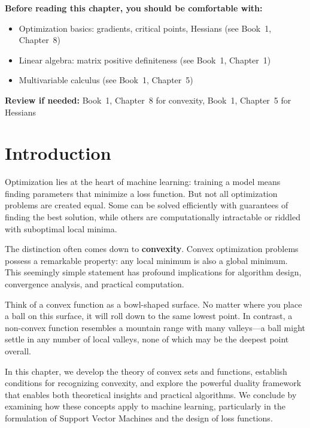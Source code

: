 \documentclass[../../main.tex]{subfiles}
\begin{document}
\begin{prerequisites}
\textbf{Before reading this chapter, you should be comfortable with:}
\begin{itemize}
    \item Optimization basics: gradients, critical points, Hessians (see Book~1, Chapter~8)
    \item Linear algebra: matrix positive definiteness (see Book~1, Chapter~1)
    \item Multivariable calculus (see Book~1, Chapter~5)
\end{itemize}
\textbf{Review if needed:} Book~1, Chapter~8 for convexity, Book~1, Chapter~5 for Hessians
\end{prerequisites}

\section{Introduction}
\label{sec:convex-intro}

Optimization lies at the heart of machine learning: training a model means finding parameters that minimize a loss function. But not all optimization problems are created equal. Some can be solved efficiently with guarantees of finding the best solution, while others are computationally intractable or riddled with suboptimal local minima.

The distinction often comes down to \textbf{convexity}. Convex optimization problems possess a remarkable property: any local minimum is also a global minimum. This seemingly simple statement has profound implications for algorithm design, convergence analysis, and practical computation.

\begin{intuition}
Think of a convex function as a bowl-shaped surface. No matter where you place a ball on this surface, it will roll down to the same lowest point. In contrast, a non-convex function resembles a mountain range with many valleys---a ball might settle in any number of local valleys, none of which may be the deepest point overall.
\end{intuition}

In this chapter, we develop the theory of convex sets and functions, establish conditions for recognizing convexity, and explore the powerful duality framework that enables both theoretical insights and practical algorithms. We conclude by examining how these concepts apply to machine learning, particularly in the formulation of Support Vector Machines and the design of loss functions.
\end{document}
